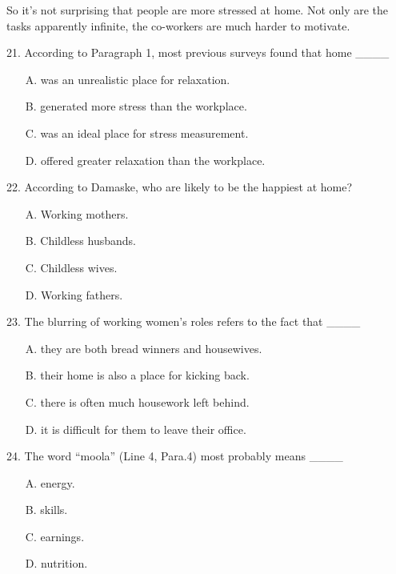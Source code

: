 \documentclass[UTF8,11pt]{ctexart}
\begin{document}
So it’s not surprising that people are more stressed at home. Not only are the tasks apparently infinite, the co-workers are much harder to motivate.


21. According to Paragraph 1, most previous surveys found that home \_\_\_\_


\begin{itemize}[leftmargin=2em,itemsep=.2em,topsep=.4em]\item[A.] was an unrealistic place for relaxation.
\item[B.] generated more stress than the workplace.
\item[C.] was an ideal place for stress measurement.
\item[D.] offered greater relaxation than the workplace.
\end{itemize}

22. According to Damaske, who are likely to be the happiest at home?


\begin{itemize}[leftmargin=2em,itemsep=.2em,topsep=.4em]\item[A.] Working mothers.
\item[B.] Childless husbands.
\item[C.] Childless wives.
\item[D.] Working fathers.
\end{itemize}

23. The blurring of working women’s roles refers to the fact that \_\_\_\_


\begin{itemize}[leftmargin=2em,itemsep=.2em,topsep=.4em]\item[A.] they are both bread winners and housewives.
\item[B.] their home is also a place for kicking back.
\item[C.] there is often much housework left behind.
\item[D.] it is difficult for them to leave their office.
\end{itemize}

24. The word “moola” (Line 4, Para.4) most probably means \_\_\_\_


\begin{itemize}[leftmargin=2em,itemsep=.2em,topsep=.4em]\item[A.] energy.
\item[B.] skills.
\item[C.] earnings.
\item[D.] nutrition.
\end{itemize}
\end{document}
